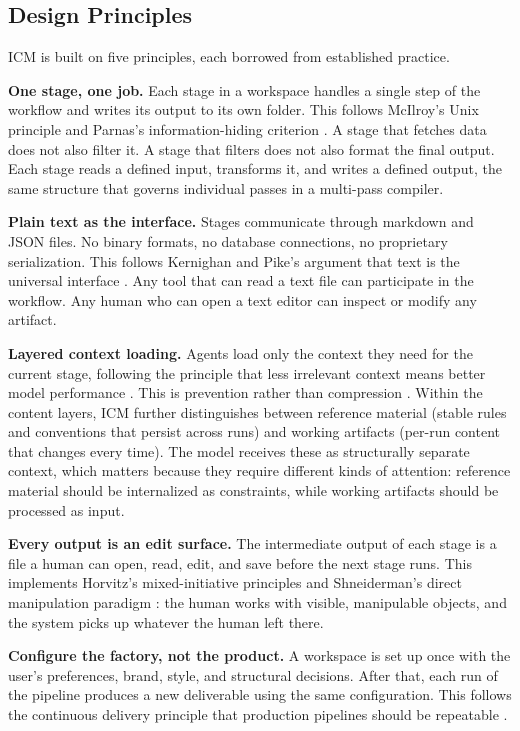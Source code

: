 \documentclass[acmlarge,nonacm,screen]{acmart}
\begin{document}
\subsection{Design Principles}

ICM is built on five principles, each borrowed from established practice.

\textbf{One stage, one job.} Each stage in a workspace handles a single step of the workflow and writes its output to its own folder. This follows McIlroy's Unix principle and Parnas's information-hiding criterion \cite{mcilroy1978, parnas1972}. A stage that fetches data does not also filter it. A stage that filters does not also format the final output. Each stage reads a defined input, transforms it, and writes a defined output, the same structure that governs individual passes in a multi-pass compiler.

\textbf{Plain text as the interface.} Stages communicate through markdown and JSON files. No binary formats, no database connections, no proprietary serialization. This follows Kernighan and Pike's argument that text is the universal interface \cite{kernighan1984}. Any tool that can read a text file can participate in the workflow. Any human who can open a text editor can inspect or modify any artifact.

\textbf{Layered context loading.} Agents load only the context they need for the current stage, following the principle that less irrelevant context means better model performance \cite{liu2024}. This is prevention rather than compression \cite{jiang2023}. Within the content layers, ICM further distinguishes between reference material (stable rules and conventions that persist across runs) and working artifacts (per-run content that changes every time). The model receives these as structurally separate context, which matters because they require different kinds of attention: reference material should be internalized as constraints, while working artifacts should be processed as input.

\textbf{Every output is an edit surface.} The intermediate output of each stage is a file a human can open, read, edit, and save before the next stage runs. This implements Horvitz's mixed-initiative principles \cite{horvitz1999} and Shneiderman's direct manipulation paradigm \cite{shneiderman1983}: the human works with visible, manipulable objects, and the system picks up whatever the human left there.

\textbf{Configure the factory, not the product.} A workspace is set up once with the user's preferences, brand, style, and structural decisions. After that, each run of the pipeline produces a new deliverable using the same configuration. This follows the continuous delivery principle that production pipelines should be repeatable \cite{humble2010}.
\end{document}
